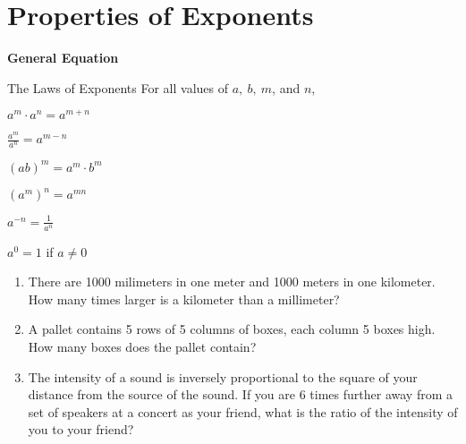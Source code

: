 \section{Properties of Exponents}

\bigskip
\textbf{General Equation} 

\bigskip
\begin{equationbox}{The Laws of Exponents}
\setlength{\columnseprule}{0pt}
For all values of $a,\ b,\ m$, and $n$,

\begin{center}
\begin{multicols}{3}

$a^m\cdot a^n = a^{m+n}$

\bigskip
$\frac{a^m}{a^n}=a^{m-n}$

$(ab)^m=a^m\cdot b^m$

\bigskip
$(a^m)^n=a^{mn}$

\columnbreak
$a^{-n}=\frac{1}{a^n}$

\bigskip
$a^0=1$ if $a\neq0$
\end{multicols}
\end{center}
\end{equationbox}

\bigskip
\begin{enumerate}[labelindent=*,style=multiline,leftmargin=*,label=\textbf{Example \arabic*:}]
\item There are 1000 milimeters in one meter and 1000 meters in one kilometer. How many times larger is a kilometer than a millimeter?

\vfill\item A pallet contains 5 rows of 5 columns of boxes, each column 5 boxes high. How many boxes does the pallet contain?

\vfill\item The intensity of a sound is inversely proportional to the square of your distance from the source of the sound. If  you are 6 times further away from a set of speakers at a concert as your friend, what is the ratio of the intensity of you to your friend?
\end{enumerate}


